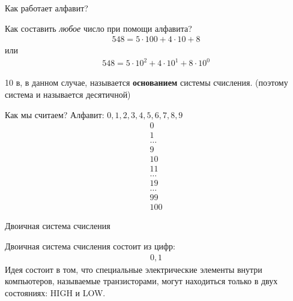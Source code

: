 \documentclass[hyperref=unicode, aspectratio=169]{beamer}
\begin{document}
\begin{frame}{Как работает алфавит?}
    \begin{example}
        Как составить \textit{любое} число при помощи алфавита?
        \begin{gather*}
            548 = 5 \cdot 100 + 4 \cdot 10 + 8
        \end{gather*}
        или
        \begin{gather*}
            548 = 5 \cdot 10^2 + 4 \cdot 10^1 + 8 \cdot 10^0
        \end{gather*}
    \end{example}
    \begin{definition}
        10 в, в данном случае, называется \textbf{основанием} системы счисления. (поэтому система и называется десятичной)
    \end{definition}
\end{frame}

\begin{frame}{Как мы считаем?}
    Алфавит: $0, 1, 2, 3, 4, 5, 6, 7, 8, 9$
    \begin{gather*}
        0      \\
        1      \\
        \ldots \\
        9      \\
        10     \\
        11     \\
        \ldots \\
        19 \\
        \ldots \\
        99 \\
        100
    \end{gather*}
\end{frame}

\begin{frame}{Двоичная система счисления}
    \begin{example}
        Двоичная система счисления состоит из цифр:
        \begin{gather*}
            0, 1
        \end{gather*}
        Идея состоит в том, что специальные электрические элементы внутри компьютеров, называемые транзисторами, могут находиться только в двух состояниях: HIGH и LOW.
    \end{example}
\end{frame}
\end{document}
